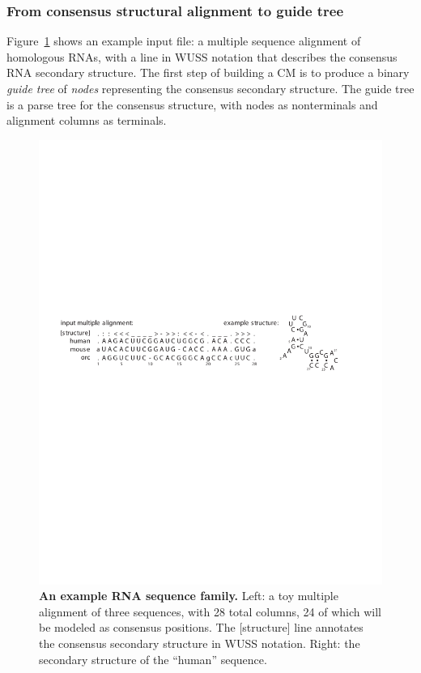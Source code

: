 \subsubsection{From consensus structural alignment to guide tree}

Figure~\ref{fig:input_alignment} shows an example input file: a
multiple sequence alignment of homologous RNAs, with a line in WUSS
notation that describes the consensus RNA secondary structure. The
first step of building a CM is to produce a binary \emph{guide tree}
of \emph{nodes} representing the consensus secondary structure. The
guide tree is a parse tree for the consensus structure, with nodes as
nonterminals and alignment columns as terminals.

\begin{figure}[t]
\begin{center}
\includegraphics[scale=0.8]{Figures/input_alignment}
\end{center}
\caption{\small\textbf{An example RNA sequence family.} Left: a toy multiple
alignment of three sequences, with 28 total columns, 24 of which will
be modeled as consensus positions. The [structure] line annotates the
consensus secondary structure in WUSS notation.
Right: the secondary structure of the ``human'' sequence.} 
\label{fig:input_alignment}
\end{figure}

